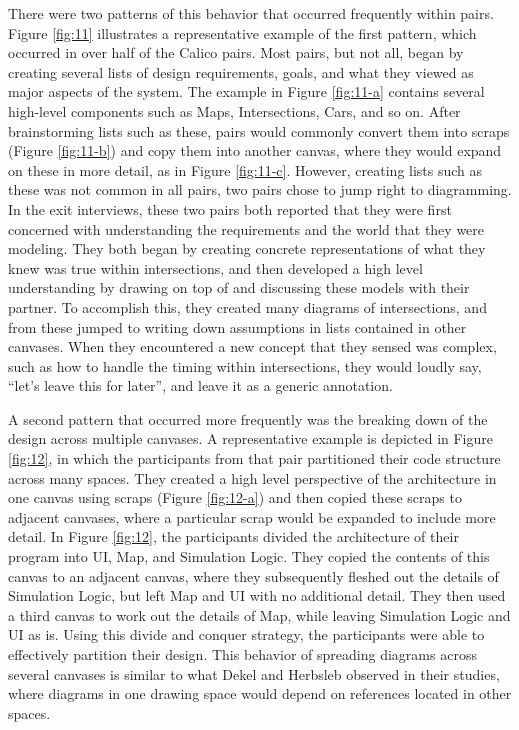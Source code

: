 There were two patterns of this behavior that occurred frequently within pairs. Figure \ref{fig:11} illustrates a representative example of the first pattern, which occurred in over half of the Calico pairs. Most pairs, but not all, began by creating several lists of design requirements, goals, and what they viewed as major aspects of the system. The example in Figure \ref{fig:11-a} contains several high-level components such as Maps, Intersections, Cars, and so on. After brainstorming lists such as these, pairs would commonly convert them into scraps (Figure \ref{fig:11-b}) and copy them into another canvas, where they would expand on these in more detail, as in Figure \ref{fig:11-c}. However, creating lists such as these was not common in all pairs, two pairs chose to jump right to diagramming. In the exit interviews, these two pairs both reported that they were first concerned with understanding the requirements and the world that they were modeling. They both began by creating concrete representations of what they knew was true within intersections, and then developed a high level understanding by drawing on top of and discussing these models with their partner. To accomplish this, they created many diagrams of intersections, and from these jumped to writing down assumptions in lists contained in other canvases. When they encountered a new concept that they sensed was complex, such as how to handle the timing within intersections, they would loudly say, ``let's leave this for later'', and leave it as a generic annotation.

A second pattern that occurred more frequently was the breaking down of the design across multiple canvases. A representative example is depicted in Figure \ref{fig:12}, in which the participants from that pair partitioned their code structure across many spaces. They created a high level perspective of the architecture in one canvas using scraps (Figure \ref{fig:12-a}) and then copied these scraps to adjacent canvases, where a particular scrap would be expanded to include more detail. In Figure \ref{fig:12}, the participants divided the architecture of their program into UI, Map, and Simulation Logic. They copied the contents of this canvas to an adjacent canvas, where they subsequently fleshed out the details of Simulation Logic, but left Map and UI with no additional detail. They then used a third canvas to work out the details of Map, while leaving Simulation Logic and UI as is. Using this divide and conquer strategy, the participants were able to effectively partition their design. This behavior of spreading diagrams across several canvases is similar to what Dekel and Herbsleb \citep{Dekela} observed in their studies, where diagrams in one drawing space would depend on references located in other spaces. 


